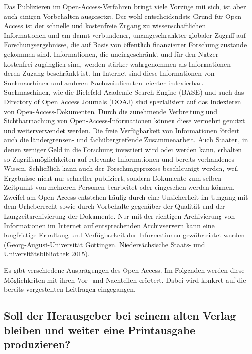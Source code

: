 \documentclass[a4paper,
fontsize=11pt,
oneside,
numbers=noperiodatend,
parskip=half-,
bibliography=totoc,
final
]{scrartcl}
\begin{document}
Das Publizieren im Open-Access-Verfahren bringt viele Vorzüge mit sich,
ist aber auch einigen Vorbehalten ausgesetzt. Der wohl entscheidendste
Grund für Open Access ist der schnelle und kostenfreie Zugang zu
wissenschaftlichen Informationen und ein damit verbundener,
uneingeschränkter globaler Zugriff auf Forschungsergebnisse, die auf
Basis von öffentlich finanzierter Forschung zustande gekommen sind.
Informationen, die uneingeschränkt und für den Nutzer kostenfrei
zugänglich sind, werden stärker wahrgenommen als Informationen deren
Zugang beschränkt ist. Im Internet sind diese Informationen von
Suchmaschinen und anderen Nachweisdiensten leichter indexierbar.
Suchmaschinen, wie die Bielefeld Academic Search Engine (BASE) und auch
das Directory of Open Access Journals (DOAJ) sind spezialisiert auf das
Indexieren von Open-Access-Dokumenten. Durch die zunehmende Verbreitung
und Sichtbarmachung von Open-Access-Informationen können diese vermehrt
genutzt und weiterverwendet werden. Die freie Verfügbarkeit von
Informationen fördert auch die ländergrenzen- und fachübergreifende
Zusammenarbeit. Auch Staaten, in denen weniger Geld in die Forschung
investiert wird oder werden kann, erhalten so Zugriffsmöglichkeiten auf
relevante Informationen und bereits vorhandenes Wissen. Schließlich kann
auch der Forschungsprozess beschleunigt werden, weil Ergebnisse nicht
nur schneller publiziert, sondern Dokumente zum selben Zeitpunkt von
mehreren Personen bearbeitet oder eingesehen werden können. Zweifel am
Open Access entstehen häufig durch eine Unsicherheit im Umgang mit dem
Urheberrecht sowie durch Vorbehalte gegenüber der Qualität und der
Langzeitarchivierung der Dokumente. Nur mit der richtigen Archivierung
von Informationen im Internet auf entsprechenden Archivservern kann eine
langfristige Erhaltung und Verfügbarkeit der Informationen gewährleistet
werden (Georg-August-Universität Göttingen. Niedersächsische Staats- und
Universitätsbibliothek 2015).

Es gibt verschiedene Ausprägungen des Open Access. Im Folgenden werden
diese Möglichkeiten mit ihren Vor- und Nachteilen erörtert. Dabei wird
konkret auf die bereits vorgestellten Leitfragen eingegangen.

\subsection*{Soll der Herausgeber bei seinem alten Verlag bleiben und
weiter eine Printausgabe
produzieren?}\label{soll-der-herausgeber-bei-seinem-alten-verlag-bleiben-und-weiter-eine-printausgabe-produzieren}
\end{document}
